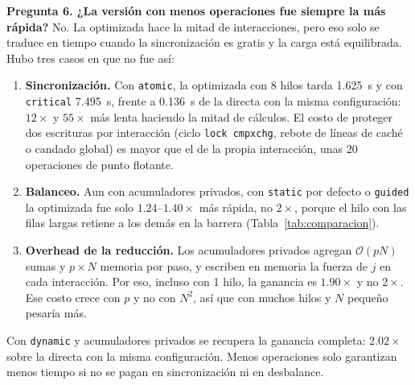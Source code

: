 \documentclass[11pt,a4paper]{article}
\begin{document}
\textbf{Pregunta 6. ¿La versión con menos operaciones fue siempre la más rápida?}
No. La optimizada hace la mitad de interacciones, pero eso solo se traduce en tiempo cuando la sincronización es gratis y la carga está equilibrada. Hubo tres casos en que no fue así:
\begin{enumerate}
    \item \textbf{Sincronización.} Con \texttt{atomic}, la optimizada con 8 hilos tarda 1.625~s y con \texttt{critical} 7.495~s, frente a 0.136~s de la directa con la misma configuración: $12\times$ y $55\times$ más lenta haciendo la mitad de cálculos. El costo de proteger dos escrituras por interacción (ciclo \texttt{lock cmpxchg}, rebote de líneas de caché o candado global) es mayor que el de la propia interacción, unas 20 operaciones de punto flotante.
    \item \textbf{Balanceo.} Aun con acumuladores privados, con \texttt{static} por defecto o \texttt{guided} la optimizada fue solo $1.24$--$1.40\times$ más rápida, no $2\times$, porque el hilo con las filas largas retiene a los demás en la barrera (Tabla~\ref{tab:comparacion}).
    \item \textbf{Overhead de la reducción.} Los acumuladores privados agregan $\mathcal{O}(pN)$ sumas y $p \times N$ memoria por paso, y escriben en memoria la fuerza de $j$ en cada interacción. Por eso, incluso con 1 hilo, la ganancia es $1.90\times$ y no $2\times$. Ese costo crece con $p$ y no con $N^2$, así que con muchos hilos y $N$ pequeño pesaría más.
\end{enumerate}
Con \texttt{dynamic} y acumuladores privados se recupera la ganancia completa: $2.02\times$ sobre la directa con la misma configuración. Menos operaciones solo garantizan menos tiempo si no se pagan en sincronización ni en desbalance.
\end{document}
